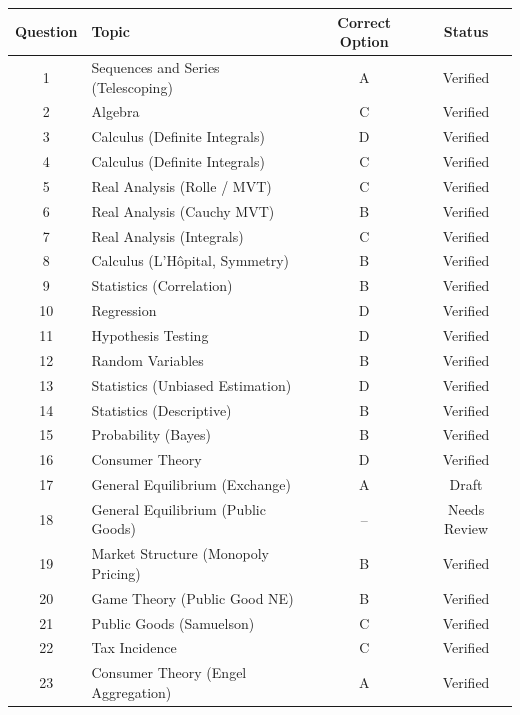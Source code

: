 \documentclass[11pt]{article}
\begin{document}
\begin{center}
\begin{tabular}{c l c c}
\toprule
Question & Topic & Correct Option & Status \\
\midrule
1  & Sequences and Series (Telescoping)         & A & Verified \\
2  & Algebra                                    & C & Verified \\
3  & Calculus (Definite Integrals)              & D & Verified \\
4  & Calculus (Definite Integrals)              & C & Verified \\
5  & Real Analysis (Rolle / MVT)                & C & Verified \\
6  & Real Analysis (Cauchy MVT)                 & B & Verified \\
7  & Real Analysis (Integrals)                  & C & Verified \\
8  & Calculus (L'H\^opital, Symmetry)           & B & Verified \\
9  & Statistics (Correlation)                   & B & Verified \\
10 & Regression                                 & D & Verified \\
11 & Hypothesis Testing                         & D & Verified \\
12 & Random Variables                           & B & Verified \\
13 & Statistics (Unbiased Estimation)           & D & Verified \\
14 & Statistics (Descriptive)                   & B & Verified \\
15 & Probability (Bayes)                        & B & Verified \\
16 & Consumer Theory                            & D & Verified \\
17 & General Equilibrium (Exchange)             & A & Draft \\
18 & General Equilibrium (Public Goods)         & -- & Needs Review \\
19 & Market Structure (Monopoly Pricing)        & B & Verified \\
20 & Game Theory (Public Good NE)               & B & Verified \\
21 & Public Goods (Samuelson)                   & C & Verified \\
22 & Tax Incidence                              & C & Verified \\
23 & Consumer Theory (Engel Aggregation)        & A & Verified \\

\end{tabular}
\end{center}
\end{document}
